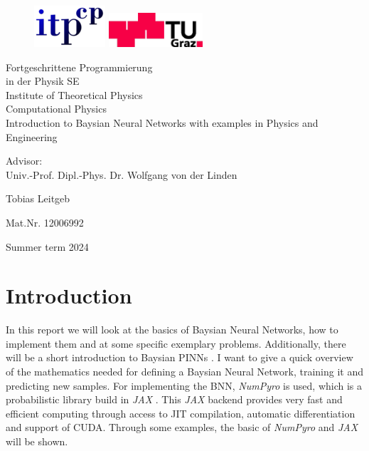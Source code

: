 \documentclass{article}
\newcommand{\bacc}{ Fortgeschrittene Programmierung \\ in der Physik SE}
\begin{document}
\begin{titlepage}
    \begin{figure}
    \includegraphics[width=3.cm]{logo-itp.png} \hfill
    \includegraphics[width=3.5cm]{logo-tu.png} \par
    \end{figure}
    
    \begin{center}
    {\huge\sc \bacc} \\ Institute of Theoretical Physics\\
    Computational Physics\\
    
    \vspace{5cm}
    {\huge\sc Introduction to Baysian Neural Networks with examples in Physics and Engineering} \par
    Advisor: \\ Univ.-Prof. Dipl.-Phys. Dr. Wolfgang von der Linden \\ 
    \vspace{5cm}
    
    {\Large\sc Tobias Leitgeb}
    
    {Mat.Nr. 12006992}
    
    \vspace{3cm}
    Summer term 2024
    \end{center}
    \end{titlepage}
\section{Introduction}
In this report we will look at the basics of Baysian Neural Networks, how to implement them and at some specific exemplary problems. Additionally, there will be a short introduction to Baysian PINNs \cite{Yang_2021}. I want to give a quick overview of the mathematics needed for defining a Baysian Neural Network, training it and predicting new samples. For implementing the BNN, \textit{NumPyro} \cite{bingham2019pyro, phan2019composable} is used, which is a probabilistic library build in \textit{JAX} \cite{jax2018github}. This \textit{JAX} backend provides very fast and efficient computing through access to JIT compilation, automatic differentiation and support of CUDA. Through some examples, the basic of \textit{NumPyro} and \textit{JAX} will be shown.
\end{document}
